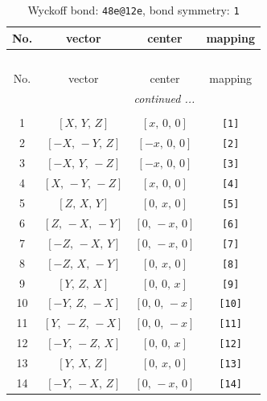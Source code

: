 \documentclass[fleqn,8pt]{jsarticle}
\begin{document}
\begin{longtable}{cccc}
\caption{Wyckoff bond: {\tt 48e@12e}, bond symmetry: {\tt 1}}
 \\
 \hline \hline
No. & vector & center & mapping \\ \hline \endfirsthead

\multicolumn{3}{l}{\tablename\ \thetable{}} \\
 \hline \hline
No. & vector & center & mapping \\ \hline \endhead

 \hline \hline
\multicolumn{3}{r}{\footnotesize\it continued ...} \\ \endfoot

 \hline \hline
\multicolumn{3}{r}{} \\ \endlastfoot

1 & $\left[ X,\, Y,\, Z \right]$ & $\left[ x,\, 0,\, 0 \right]$ & {\tt [1]} \\ \hline
2 & $\left[ - X,\, - Y,\, Z \right]$ & $\left[ - x,\, 0,\, 0 \right]$ & {\tt [2]} \\ \hline
3 & $\left[ - X,\, Y,\, - Z \right]$ & $\left[ - x,\, 0,\, 0 \right]$ & {\tt [3]} \\ \hline
4 & $\left[ X,\, - Y,\, - Z \right]$ & $\left[ x,\, 0,\, 0 \right]$ & {\tt [4]} \\ \hline
5 & $\left[ Z,\, X,\, Y \right]$ & $\left[ 0,\, x,\, 0 \right]$ & {\tt [5]} \\ \hline
6 & $\left[ Z,\, - X,\, - Y \right]$ & $\left[ 0,\, - x,\, 0 \right]$ & {\tt [6]} \\ \hline
7 & $\left[ - Z,\, - X,\, Y \right]$ & $\left[ 0,\, - x,\, 0 \right]$ & {\tt [7]} \\ \hline
8 & $\left[ - Z,\, X,\, - Y \right]$ & $\left[ 0,\, x,\, 0 \right]$ & {\tt [8]} \\ \hline
9 & $\left[ Y,\, Z,\, X \right]$ & $\left[ 0,\, 0,\, x \right]$ & {\tt [9]} \\ \hline
10 & $\left[ - Y,\, Z,\, - X \right]$ & $\left[ 0,\, 0,\, - x \right]$ & {\tt [10]} \\ \hline
11 & $\left[ Y,\, - Z,\, - X \right]$ & $\left[ 0,\, 0,\, - x \right]$ & {\tt [11]} \\ \hline
12 & $\left[ - Y,\, - Z,\, X \right]$ & $\left[ 0,\, 0,\, x \right]$ & {\tt [12]} \\ \hline
13 & $\left[ Y,\, X,\, Z \right]$ & $\left[ 0,\, x,\, 0 \right]$ & {\tt [13]} \\ \hline
14 & $\left[ - Y,\, - X,\, Z \right]$ & $\left[ 0,\, - x,\, 0 \right]$ & {\tt [14]} \\ \hline

\end{longtable}
\end{document}
